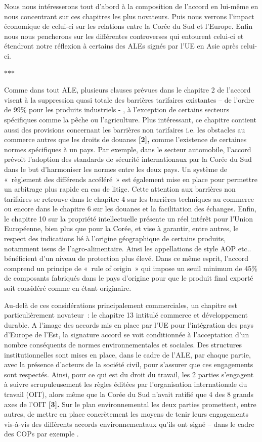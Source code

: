 \documentclass[11pt,a4paper]{article}
\newcommand{\partbreak}{\par\begin{center}\color{muted}$\ast$\quad$\ast$\quad$\ast$\end{center}\par}
\begin{document}
Nous nous intéresserons tout d'abord à la composition de l'accord en lui-même en nous concentrant sur ces chapitres les plus novateurs. Puis nous verrons l'impact économique de celui-ci sur les relations entre la Corée du Sud et l'Europe. Enfin nous nous pencherons sur les différentes controverses qui entourent celui-ci et étendront notre réflexion à certains des ALEs signés par l'UE en Asie après celui-ci.

\partbreak

Comme dans tout ALE, plusieurs clauses prévues dans le chapitre 2 de l'accord visent à la suppression quasi totale des barrières tarifaires existantes -- de l'ordre de 99\% pour les produits industriels - , à l'exception de certains secteurs spécifiques comme la pêche ou l'agriculture. Plus intéressant, ce chapitre contient aussi des provisions concernant les barrières non tarifaires i.e. les obstacles au commerce autres que les droits de douanes \textbf{{[}2{]},} comme l'existence de certaines normes spécifiques à un pays. Par exemple, dans le secteur automobile, l'accord prévoit l'adoption des standards de sécurité internationaux par la Corée du Sud dans le but d'harmoniser les normes entre les deux pays. Un système de «~règlement des différends accéléré~» est également mise en place pour permettre un arbitrage plus rapide en cas de litige. Cette attention aux barrières non tarifaires se retrouve dans le chapitre 4 sur les barrières techniques au commerce ou encore dans le chapitre 6 sur les douanes et la facilitation des échanges. Enfin, le chapitre 10 sur la propriété intellectuelle présente un réel intérêt pour l'Union Européenne, bien plus que pour la Corée, et vise à garantir, entre autres, le respect des indications lié à l'origine géographique de certains produits, notamment issus de l'agro-alimentaire. Ainsi les appellations de style AOP etc.. bénéficient d'un niveau de protection plus élevé. Dans ce même esprit, l'accord comprend un principe de «~rule of origin~» qui impose un seuil minimum de 45\% de composants fabriqués dans le pays d'origine pour que le produit final exporté soit considéré comme en étant originaire.

Au-delà de ces considérations principalement commerciales, un chapitre est particulièrement novateur~: le chapitre 13 intitulé commerce et développement durable. A l'image des accords mis en place par l'UE pour l'intégration des pays d'Europe de l'Est, la signature accord se voit conditionnée à l'acceptation d'un nombre conséquents de normes environnementales et sociales. Des structures institutionnelles sont mises en place, dans le cadre de l'ALE, par chaque partie, avec la présence d'acteurs de la société civil, pour s'assurer que ces engagements sont respectés. Ainsi, pour ce qui est du droit du travail, les 2 parties s'engagent à suivre scrupuleusement les règles éditées par l'organisation internationale du travail (OIT), alors même que la Corée du Sud n'avait ratifié que 4 des 8 grands axes de l'OIT \textbf{{[}3{]}.} Sur le plan environnemental les deux parties promettent, entre autres, de mettre en place concrètement les moyens de tenir leurs engagements vis-à-vis des différents accords environnementaux qu'ils ont signé -- dans le cadre des COPs par exemple .
\end{document}

